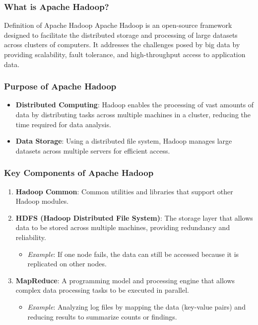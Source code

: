 \documentclass{beamer}
\begin{document}
\begin{frame}[fragile]
    \frametitle{What is Apache Hadoop?}
    \begin{block}{Definition of Apache Hadoop}
        Apache Hadoop is an open-source framework designed to facilitate the distributed storage and processing of large datasets across clusters of computers. It addresses the challenges posed by big data by providing scalability, fault tolerance, and high-throughput access to application data.
    \end{block}
\end{frame}

\begin{frame}[fragile]
    \frametitle{Purpose of Apache Hadoop}
    \begin{itemize}
        \item \textbf{Distributed Computing}: Hadoop enables the processing of vast amounts of data by distributing tasks across multiple machines in a cluster, reducing the time required for data analysis.
        \item \textbf{Data Storage}: Using a distributed file system, Hadoop manages large datasets across multiple servers for efficient access.
    \end{itemize}
\end{frame}

\begin{frame}[fragile]
    \frametitle{Key Components of Apache Hadoop}
    \begin{enumerate}
        \item \textbf{Hadoop Common}: Common utilities and libraries that support other Hadoop modules.
        \item \textbf{HDFS (Hadoop Distributed File System)}: The storage layer that allows data to be stored across multiple machines, providing redundancy and reliability.
            \begin{itemize}
                \item \textit{Example}: If one node fails, the data can still be accessed because it is replicated on other nodes.
            \end{itemize}
        \item \textbf{MapReduce}: A programming model and processing engine that allows complex data processing tasks to be executed in parallel.
            \begin{itemize}
                \item \textit{Example}: Analyzing log files by mapping the data (key-value pairs) and reducing results to summarize counts or findings.
            \end{itemize}
    \end{enumerate}
\end{frame}
\end{document}
